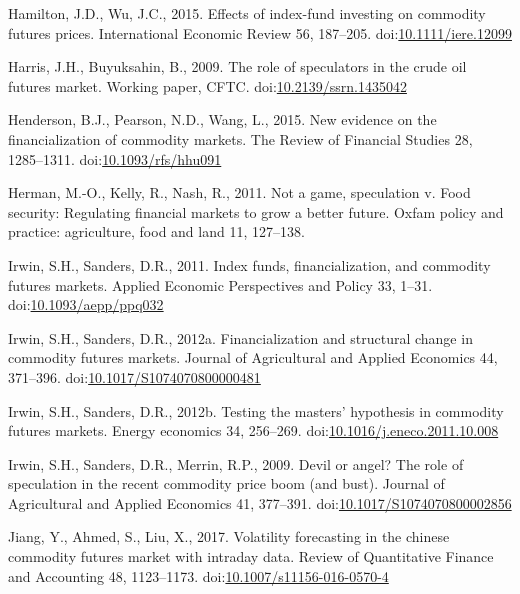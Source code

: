 \documentclass[]{elsarticle} %
\begin{document}
\leavevmode\hypertarget{ref-hamilton_effects_2015}{}%
Hamilton, J.D., Wu, J.C., 2015. Effects of index-fund investing on
commodity futures prices. International Economic Review 56, 187--205.
doi:\href{https://doi.org/10.1111/iere.12099}{10.1111/iere.12099}

\leavevmode\hypertarget{ref-harris_role_2009}{}%
Harris, J.H., Buyuksahin, B., 2009. The role of speculators in the crude
oil futures market. Working paper, CFTC.
doi:\href{https://doi.org/10.2139/ssrn.1435042}{10.2139/ssrn.1435042}

\leavevmode\hypertarget{ref-henderson_new_2015}{}%
Henderson, B.J., Pearson, N.D., Wang, L., 2015. New evidence on the
financialization of commodity markets. The Review of Financial Studies
28, 1285--1311.
doi:\href{https://doi.org/10.1093/rfs/hhu091}{10.1093/rfs/hhu091}

\leavevmode\hypertarget{ref-herman_not_2011}{}%
Herman, M.-O., Kelly, R., Nash, R., 2011. Not a game, speculation v.
Food security: Regulating financial markets to grow a better future.
Oxfam policy and practice: agriculture, food and land 11, 127--138.

\leavevmode\hypertarget{ref-irwin_index_2011}{}%
Irwin, S.H., Sanders, D.R., 2011. Index funds, financialization, and
commodity futures markets. Applied Economic Perspectives and Policy 33,
1--31.
doi:\href{https://doi.org/10.1093/aepp/ppq032}{10.1093/aepp/ppq032}

\leavevmode\hypertarget{ref-irwin_financialization_2012}{}%
Irwin, S.H., Sanders, D.R., 2012a. Financialization and structural
change in commodity futures markets. Journal of Agricultural and Applied
Economics 44, 371--396.
doi:\href{https://doi.org/10.1017/S1074070800000481}{10.1017/S1074070800000481}

\leavevmode\hypertarget{ref-irwin_testing_2012}{}%
Irwin, S.H., Sanders, D.R., 2012b. Testing the masters' hypothesis in
commodity futures markets. Energy economics 34, 256--269.
doi:\href{https://doi.org/10.1016/j.eneco.2011.10.008}{10.1016/j.eneco.2011.10.008}

\leavevmode\hypertarget{ref-irwin_devil_2009}{}%
Irwin, S.H., Sanders, D.R., Merrin, R.P., 2009. Devil or angel? The role
of speculation in the recent commodity price boom (and bust). Journal of
Agricultural and Applied Economics 41, 377--391.
doi:\href{https://doi.org/10.1017/S1074070800002856}{10.1017/S1074070800002856}

\leavevmode\hypertarget{ref-jiang_volatility_2017}{}%
Jiang, Y., Ahmed, S., Liu, X., 2017. Volatility forecasting in the
chinese commodity futures market with intraday data. Review of
Quantitative Finance and Accounting 48, 1123--1173.
doi:\href{https://doi.org/10.1007/s11156-016-0570-4}{10.1007/s11156-016-0570-4}
\end{document}

